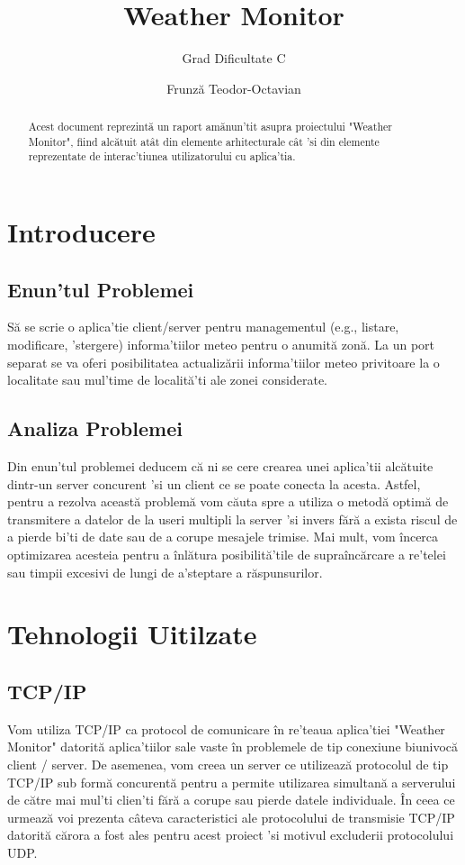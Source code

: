 \documentclass{llncs}
\begin{document}
%
\title{Weather Monitor}
%
\subtitle{Grad Dificultate C}
%
\author{Frunză Teodor-Octavian}
%
%
\maketitle
%
\begin{abstract}
Acest document reprezintă un raport amănun'tit asupra proiectului "Weather Monitor", fiind alcătuit atât din elemente arhitecturale cât 'si din elemente reprezentate de interac'tiunea utilizatorului cu aplica'tia.
\end{abstract}
%
\section{Introducere}
%
\subsection{Enun'tul Problemei}
Să se scrie o aplica'tie client/server pentru managementul (e.g., listare, modificare, 'stergere) informa'tiilor meteo pentru o anumită zonă. La un port separat se va oferi posibilitatea actualizării informa'tiilor meteo privitoare la o localitate sau mul'time de localită'ti ale zonei considerate.
%
\subsection{Analiza Problemei}
Din enun'tul problemei deducem că ni se cere crearea unei aplica'tii alcătuite dintr-un server concurent 'si un client ce se poate conecta la acesta.
Astfel, pentru a rezolva această problemă vom căuta spre a utiliza o metodă optimă de transmitere a datelor de la useri multipli la server 'si invers fără a exista riscul de a pierde bi'ti de date sau de a corupe mesajele trimise. Mai mult, vom încerca optimizarea acesteia pentru a înlătura posibilită'tile de supraîncărcare a re'telei sau timpii excesivi de lungi de a'steptare a răspunsurilor.
%
\section{Tehnologii Uitilzate}
%
\subsection{TCP/IP}
Vom utiliza TCP/IP ca protocol de comunicare în re'teaua aplica'tiei "Weather Monitor" datorită aplica'tiilor sale vaste în problemele de tip conexiune biunivocă client / server. De asemenea, vom creea un server ce utilizează protocolul de tip TCP/IP sub formă concurentă pentru a permite utilizarea simultană a serverului de către mai mul'ti clien'ti fără a corupe sau pierde datele individuale. În ceea ce urmează voi prezenta câteva caracteristici ale protocolului de transmisie TCP/IP datorită cărora a fost ales pentru acest proiect 'si motivul excluderii protocolului UDP.
%
\end{document}
